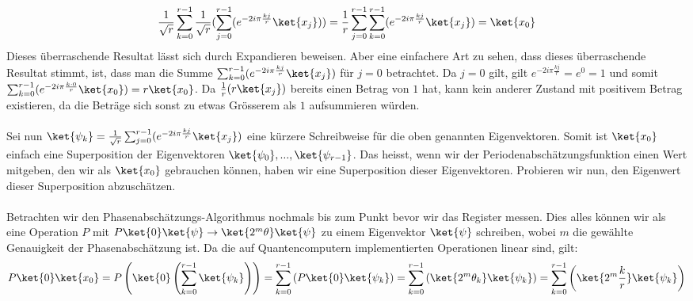 \begin{align*}
    \frac{1}{\sqrt{r}}\sum_{k = 0}^{r - 1}\frac{1}{\sqrt{r}}(\sum_{j = 0}^{r - 1}(e^{-2i\pi\frac{kj}{r}}\ket{x_j})) = \frac{1}{r}\sum_{j = 0}^{r - 1}\sum_{k = 0}^{r - 1}(e^{-2i\pi\frac{kj}{r}}\ket{x_j}) = \ket{x_0}
\end{align*}
Dieses überraschende Resultat lässt sich durch Expandieren beweisen. Aber eine einfachere Art zu sehen, dass dieses überraschende Resultat stimmt, ist, dass man die Summe $\sum_{k = 0}^{r - 1}(e^{-2i\pi\frac{kj}{r}}\ket{x_j})$ für $j = 0$ betrachtet. Da $j = 0$ gilt, gilt $e^{-2i\pi\frac{kj}{r}} = e^{0} = 1$ und somit $\sum_{k = 0}^{r - 1}(e^{-2i\pi\frac{k\cdot 0}{r}}\ket{x_0}) = r\ket{x_0}$. Da $\frac{1}{r}(r\ket{x_j})$ bereits einen Betrag von $1$ hat, kann kein anderer Zustand mit positivem Betrag existieren, da die Beträge sich sonst zu etwas Grösserem als $1$ aufsummieren würden.

\paragraph{}

Sei nun $\ket{\psi_k} = \frac{1}{\sqrt{r}}\sum_{j = 0}^{r - 1}(e^{-2i\pi\frac{kj}{r}}\ket{x_j})$ eine kürzere Schreibweise für die oben genannten Eigenvektoren. Somit ist $\ket{x_0}$ einfach eine Superposition der Eigenvektoren $\ket{\psi_0}, ..., \ket{\psi_{r - 1}}$. Das heisst, wenn wir der Periodenabschätzungsfunktion einen Wert mitgeben, den wir als $\ket{x_0}$ gebrauchen können, haben wir eine Superposition dieser Eigenvektoren. Probieren wir nun, den Eigenwert dieser Superposition abzuschätzen.

\paragraph{}
Betrachten wir den Phasenabschätzungs-Algorithmus nochmals bis zum Punkt bevor wir das Register messen. Dies alles können wir als eine Operation $P$ mit $P\ket{0}\ket{\psi} \rightarrow \ket{2^m\theta}\ket{\psi}$ zu einem Eigenvektor $\ket{\psi}$ schreiben, wobei $m$ die gewählte Genauigkeit der Phasenabschätzung ist. Da die auf Quantencomputern implementierten Operationen linear sind, gilt: $$P\ket{0}\ket{x_0} = P\left(\ket{0}\left(\sum_{k = 0}^{r - 1}\ket{\psi_k}\right)\right) = \sum_{k = 0}^{r - 1}\left(P\ket{0}\ket{\psi_k}\right) = \sum_{k = 0}^{r - 1}\left(\ket{2^m\theta_k}\ket{\psi_k}\right) = \sum_{k = 0}^{r - 1}\left(\ket{2^m\frac{k}{r}}\ket{\psi_k}\right)$$


